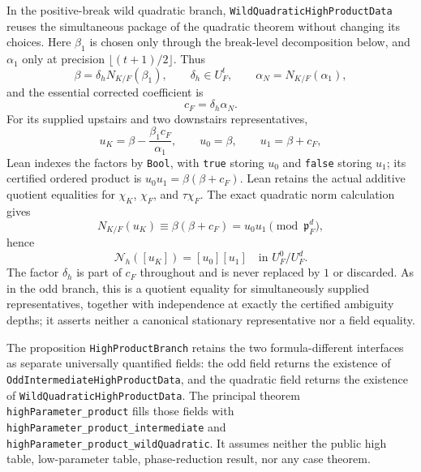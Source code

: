 \begin{theorem}
In the positive-break wild quadratic branch,
\texttt{WildQuadraticHighProductData} reuses the simultaneous package of
the quadratic theorem without changing its choices.  Here
$\beta_1$ is chosen only through the break-level decomposition below, and
$\alpha_1$ only at precision $\lfloor(t+1)/2\rfloor$.  Thus
\[
 \beta=\delta_hN_{K/F}(\beta_1),
 \qquad \delta_h\in U_F^t,
 \qquad \alpha_N=N_{K/F}(\alpha_1),
\]
and the essential corrected coefficient is
\[
 c_F=\delta_h\alpha_N.
\]
For its supplied upstairs and two downstairs representatives,
\[
 u_K=\beta-\frac{\beta_1c_F}{\alpha_1},
 \qquad u_0=\beta,
 \qquad u_1=\beta+c_F,
\]
Lean indexes the factors by \texttt{Bool}, with \texttt{true} storing $u_0$
and \texttt{false} storing $u_1$; its certified ordered product is
$u_0u_1=\beta(\beta+c_F)$.  Lean retains the actual additive quotient
equalities for $\chi_K$,
$\chi_F$, and $\tau\chi_F$.  The exact quadratic norm calculation gives
\[
 N_{K/F}(u_K)\equiv
   \beta(\beta+c_F)
   =u_0u_1\pmod{\mathfrak p_F^d},
\]
hence
\[
 \mathcal N_h([u_K])=[u_0][u_1]
   \quad\text{in }U_F^0/U_F^d.
\]
The factor $\delta_h$ is part of $c_F$ throughout and is never replaced by
$1$ or discarded.  As in the odd branch, this is a quotient equality for
simultaneously supplied representatives, together with independence at
exactly the certified ambiguity depths; it asserts neither a canonical
stationary representative nor a field equality.

The proposition \texttt{HighProductBranch} retains the two formula-different
interfaces as separate universally quantified fields: the odd field returns
the existence of \texttt{OddIntermediateHighProductData}, and the quadratic
field returns the existence of \texttt{WildQuadraticHighProductData}.  The
principal theorem
\texttt{highParameter\_product} fills those fields with
\texttt{highParameter\_product\_intermediate} and
\texttt{highParameter\_product\_wildQuadratic}.  It assumes neither the
public high table, low-parameter table, phase-reduction result, nor any case
theorem.


\end{theorem}
